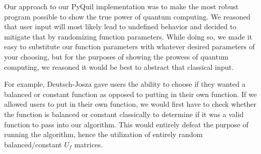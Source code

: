 \documentclass[12pt]{article}
\begin{document}
Our approach to our PyQuil implementation was to make the most robust program possible to show the true power of quantum computing.
We reasoned that user input will most likely lead to undefined behavior and decided to mitigate that by randomizing function parameters.
While doing so, we made it easy to substitute our function parameters with whatever desired parameters of your choosing, but for the purposes of showing the prowess of quantum computing, we reasoned it would be best to abstract that classical input.

For example, Deutsch-Josza gave users the ability to choose if they wanted a balanced or constant function as opposed to putting in their own function.
If we allowed users to put in their own function, we would first have to check whether the function is balanced or constant classically to determine if it was a valid function to pass into our algorithm.
This would entirely defeat the purpose of running the algorithm, hence the utilization of entirely random balanced/constant $U_f$ matrices.

\nocite{pyquil}
\nocite{Qiskit}
\end{document}

